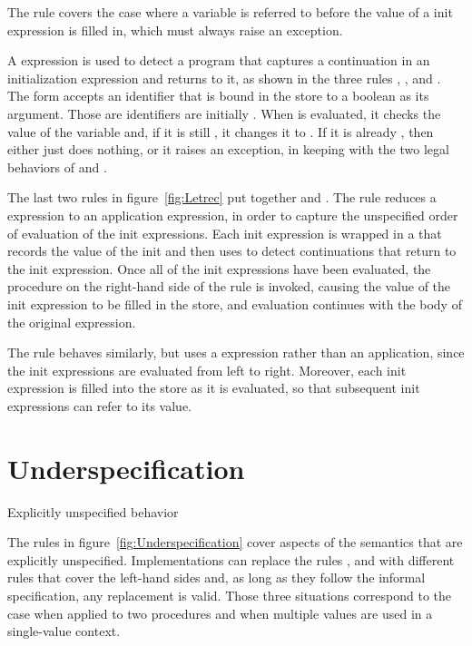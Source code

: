 The  rule covers the case where a variable is referred
to before the value of a init expression is filled in, which must
always raise an exception.

A  expression is used to detect a program that captures a continuation in an initialization expression and returns to it, as shown in the three rules , , and . The  form accepts an identifier that is bound in the store to a boolean as its argument. Those are identifiers are initially \semfalse{}. When  is evaluated, it checks the value of the variable and, if it is still \semfalse{}, it changes it to \semtrue{}. If it is already \semtrue{}, then  either just does nothing, or it raises an exception, in keeping with the two legal behaviors of  and . 

The last two rules in figure~\ref{fig:Letrec} put together  and . The  rule reduces a  expression to an application expression, in order to capture the unspecified order of evaluation of the init expressions. Each init expression is wrapped in a  that records the value of the init and then uses  to detect continuations that return to the init expression. Once all of the init expressions have been evaluated, the procedure on the right-hand side of the rule is invoked, causing the value of the init expression to be filled in the store, and evaluation continues with the body of the original  expression.

The  rule behaves similarly, but uses a  expression rather than an application, since the init expressions are evaluated from left to right. Moreover, each init expression is filled into the store as it is evaluated, so that subsequent init expressions can refer to its value.

\section{Underspecification}\label{sec:semantics:underspecification}

\beginfig
\begin{center}

\end{center}
\caption{Explicitly unspecified behavior}\label{fig:Underspecification}
\endfig

The rules in figure~\ref{fig:Underspecification} cover aspects of the
semantics that are explicitly unspecified. Implementations can replace
the rules ,  and with different rules that cover the left-hand sides and, as long as they follow the informal specification, any replacement is valid. Those three situations correspond to the case when  applied to two procedures and when multiple values are used in a single-value context.

